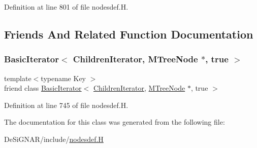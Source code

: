Definition at line 801 of file nodesdef.\+H.



\subsection{Friends And Related Function Documentation}
\mbox{\label{class_designar_1_1_m_tree_node_1_1_children_iterator_a9318ecb15aa59102557883ca0b98fea5}} 
\subsubsection{\texorpdfstring{Basic\+Iterator$<$ Children\+Iterator, M\+Tree\+Node $\ast$, true $>$}{BasicIterator< ChildrenIterator, MTreeNode *, true >}}
{\footnotesize\ttfamily template$<$typename Key $>$ \\
friend class \hyperlink{class_designar_1_1_basic_iterator}{Basic\+Iterator}$<$ \hyperlink{class_designar_1_1_m_tree_node_1_1_children_iterator}{Children\+Iterator}, \hyperlink{class_designar_1_1_m_tree_node}{M\+Tree\+Node} $\ast$, true $>$\hspace{0.3cm}{\ttfamily [friend]}}



Definition at line 745 of file nodesdef.\+H.



The documentation for this class was generated from the following file\+:\begin{DoxyCompactItemize}
\item 
De\+Si\+G\+N\+A\+R/include/\hyperlink{nodesdef_8_h}{nodesdef.\+H}\end{DoxyCompactItemize}
